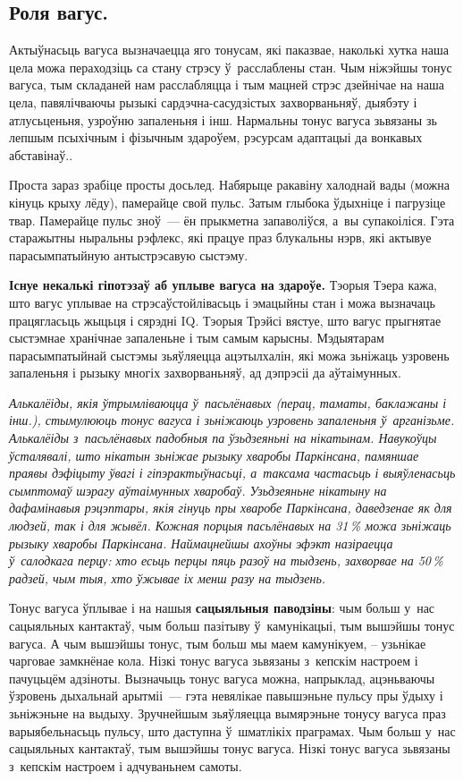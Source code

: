 \subsection*{Роля вагус.}

Актыўнасьць вагуса вызначаецца яго тонусам, які паказвае, наколькі хутка наша цела можа пераходзіць са стану стрэсу ў~расслаблены стан. Чым ніжэйшы тонус вагуса, тым складаней нам расслабляцца і тым мацней стрэс дзейнічае на наша цела, павялічваючы рызыкі сардэчна-сасудзістых захворваньняў, дыябэту і атлусьценьня, узроўню запаленьня і інш. Нармальны тонус вагуса зьвязаны зь лепшым псыхічным і фізычным здароўем, рэсурсам адаптацыі да вонкавых абставінаў..

Проста зараз зрабіце просты досьлед. Набярыце ракавіну халоднай вады (можна кінуць крыху лёду), памерайце свой пульс. Затым глыбока ўдыхніце і пагрузіце твар. Памерайце пульс зноў~--- ён прыкметна запаволіўся, а~вы супакоіліся. Гэта старажытны ныральны рэфлекс, які працуе праз блукальны нэрв, які актывуе парасымпатыйную антыстрэсавую сыстэму.

\textbf{Існуе некалькі гіпотэзаў аб уплыве вагуса на здароўе.} Тэорыя Тэера кажа, што вагус уплывае на стрэсаўстойлівасьць і эмацыйны стан і можа вызначаць працягласьць жыцьця і сярэдні IQ. Тэорыя Трэйсі вястуе, што вагус прыгнятае сыстэмнае хранічнае запаленьне і тым самым карысны. Мэдыятарам парасымпатыйнай сыстэмы зьяўляецца ацэтылхалін, які можа зьніжаць узровень запаленьня і рызыку многіх захворваньняў, ад дэпрэсіі да аўтаімунных.

\emph{Алькалёіды, якія ўтрымліваюцца ў~пасьлёнавых (перац, таматы, баклажаны і інш.), стымулююць тонус вагуса і зьніжаюць узровень запаленьня ў~арганізьме. Алькалёіды з~пасьлёнавых падобныя па ўзьдзеяньні на нікатынам. Навукоўцы ўсталявалі, што нікатын зьніжае рызыку хваробы Паркінсана, памяншае праявы дэфіцыту ўвагі і гіпэрактыўнасьці, а~таксама частасьць і выяўленасьць сымптомаў шэрагу аўтаімунных хваробаў. Узьдзеяньне нікатыну на дафамінавыя рэцэптары, якія гінуць пры хваробе Паркінсана, даведзенае як для людзей, так і для жывёл. Кожная порцыя пасьлёнавых на 31\,\% можа зьніжаць рызыку хваробы Паркінсана. Наймацнейшы ахоўны эфэкт назіраецца ў~салодкага перцу: хто есьць перцы пяць разоў на тыдзень, захворвае на 50\,\% радзей, чым тыя, хто ўжывае іх менш разу на тыдзень.}

Тонус вагуса ўплывае і на нашыя \textbf{сацыяльныя паводзіны}: чым больш у~нас сацыяльных кантактаў, чым больш пазітыву ў~камунікацыі, тым вышэйшы тонус вагуса. А чым вышэйшы тонус, тым больш мы маем камунікуем, -- узьнікае чарговае замкнёнае кола. Нізкі тонус вагуса зьвязаны з~кепскім настроем і пачуцьцём адзіноты. Вызначыць тонус вагуса можна, напрыклад, ацэньваючы ўзровень дыхальнай арытміі~--- гэта невялікае павышэньне пульсу пры ўдыху і зьніжэньне на выдыху. Зручнейшым зьяўляецца вымярэньне тонусу вагуса праз варыябельнасьць пульсу, што даступна ў~шматлікіх праграмах. Чым больш у~нас сацыяльных кантактаў, тым вышэйшы тонус вагуса. Нізкі тонус вагуса зьвязаны з~кепскім настроем і адчуваньнем самоты.

